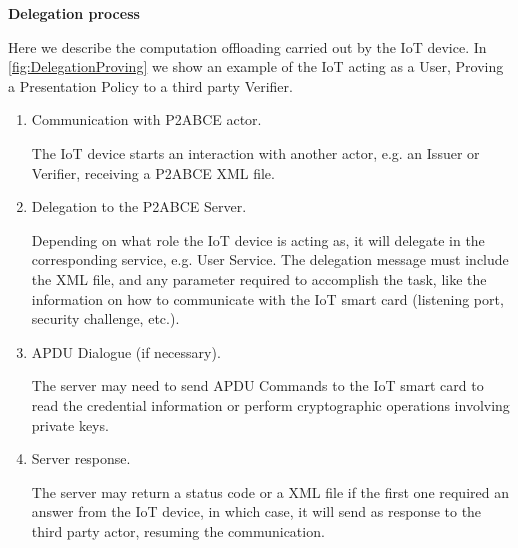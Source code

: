 \hfil

\begin{flushleft}
	\textbf{Delegation process}
\end{flushleft}

Here we describe the computation offloading carried out by the IoT device.  In \autoref{fig:DelegationProving} we show an example of the IoT acting as a User, Proving a Presentation Policy to a third party Verifier.

\begin{enumerate}
	\item Communication with P2ABCE actor.
	
	The IoT device starts an interaction with another actor, e.g. an Issuer or Verifier, receiving a P2ABCE XML file.
	
	
	\item Delegation to the P2ABCE Server.
	
	Depending on what role the IoT device is acting as, it will delegate in the corresponding service, e.g. User Service. The delegation message must include the XML file, and any parameter required to accomplish the task, like the information on how to communicate with the IoT smart card (listening port, security challenge, etc.).
	
	\item APDU Dialogue (if necessary).
	
	The server may need to send APDU Commands to the IoT smart card to read the credential information or perform cryptographic operations involving private keys.
	
	\item Server response.
	
	The server may return a status code or a XML file if the first one required an answer from the IoT device, in which case, it will send as response to the third party actor, resuming the communication.
	
\end{enumerate}

